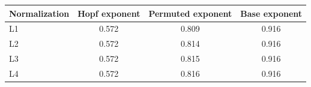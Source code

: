 \begin{tabular}{lccc}
\toprule
Normalization & Hopf exponent & Permuted exponent & Base exponent \\
\midrule
L1 & 0.572 & 0.809 & 0.916 \\
L2 & 0.572 & 0.814 & 0.916 \\
L3 & 0.572 & 0.815 & 0.916 \\
L4 & 0.572 & 0.816 & 0.916 \\
\bottomrule
\end{tabular}
